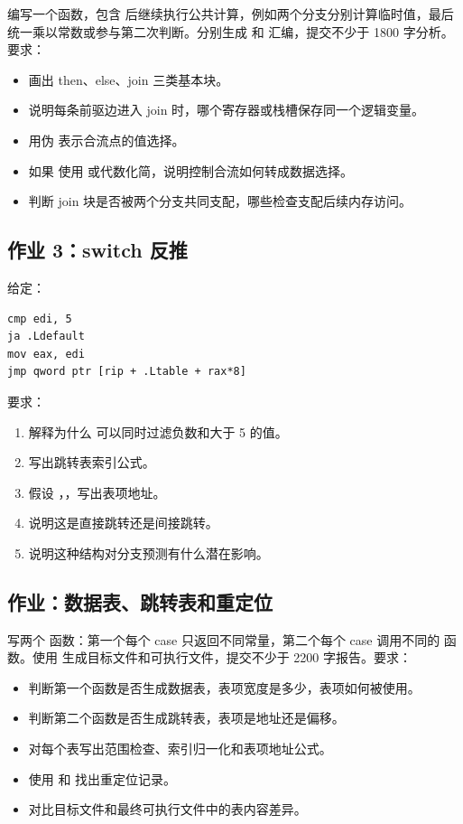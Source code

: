 \begin{exercisebox}
编写一个函数，包含  后继续执行公共计算，例如两个分支分别计算临时值，最后统一乘以常数或参与第二次判断。分别生成  和  汇编，提交不少于 1800 字分析。要求：

\begin{itemize}
  \item 画出 then、else、join 三类基本块。
  \item 说明每条前驱边进入 join 时，哪个寄存器或栈槽保存同一个逻辑变量。
  \item 用伪  表示合流点的值选择。
  \item 如果  使用  或代数化简，说明控制合流如何转成数据选择。
  \item 判断 join 块是否被两个分支共同支配，哪些检查支配后续内存访问。
\end{itemize}

\subsection*{作业 3：switch 反推}

给定：

\begin{lstlisting}
cmp edi, 5
ja .Ldefault
mov eax, edi
jmp qword ptr [rip + .Ltable + rax*8]
\end{lstlisting}

要求：

\begin{enumerate}
  \item 解释为什么  可以同时过滤负数和大于 5 的值。
  \item 写出跳转表索引公式。
  \item 假设 ，，写出表项地址。
  \item 说明这是直接跳转还是间接跳转。
  \item 说明这种结构对分支预测有什么潜在影响。
\end{enumerate}

\subsection*{作业：数据表、跳转表和重定位}

写两个  函数：第一个每个 case 只返回不同常量，第二个每个 case 调用不同的  函数。使用  生成目标文件和可执行文件，提交不少于 2200 字报告。要求：

\begin{itemize}
  \item 判断第一个函数是否生成数据表，表项宽度是多少，表项如何被使用。
  \item 判断第二个函数是否生成跳转表，表项是地址还是偏移。
  \item 对每个表写出范围检查、索引归一化和表项地址公式。
  \item 使用  和  找出重定位记录。
  \item 对比目标文件和最终可执行文件中的表内容差异。
\end{itemize}


\end{exercisebox}
